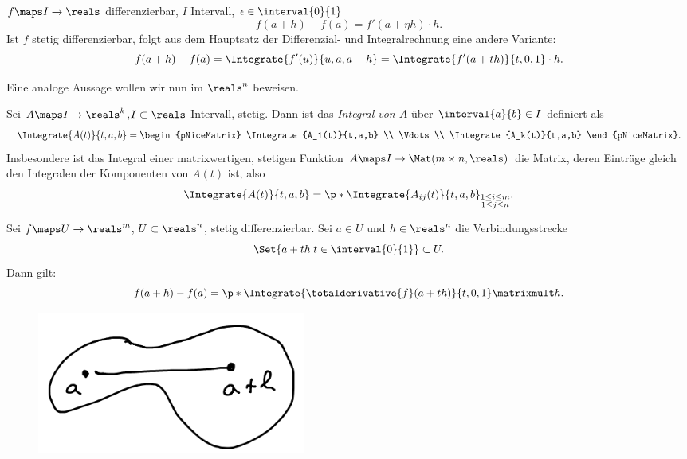 \begin{bemerkung*}
    \( f\maps I\to \reals \) differenzierbar, \( I \) Intervall, \texists \( \epsilon\in \interval{0}{1} \) \sd
    \begin{equation*}
        f(a+h)-f(a)=f'(a+\eta h)\cdot h.
    \end{equation*}
    Ist \( f \) stetig differenzierbar, folgt aus dem Hauptsatz der Differenzial- und Integralrechnung eine andere Variante:
    \begin{equation*}
        f(a+h)-f(a)=\Integrate{f'(u)}{u,a,a+h}=\Integrate{f'(a+th)}{t,0,1}\cdot h.
    \end{equation*}
\end{bemerkung*}
Eine analoge Aussage wollen wir nun im \( \reals^n \) beweisen.
\begin{definition*}
    Sei \( A\maps I\to \reals^k \),\( I\subset \reals \) Intervall, stetig. Dann ist das \emph{Integral von \( A \)} über \( \interval{a}{b}\in I \) definiert als
    \begin{equation*}
        \Integrate{A(t)}{t,a,b}=\begin{pNiceMatrix} \Integrate{A_1(t)}{t,a,b} \\ \Vdots \\ \Integrate{A_k(t)}{t,a,b} \end{pNiceMatrix}.
    \end{equation*}
    Insbesondere ist das Integral einer matrixwertigen, stetigen Funktion \( A\maps I\to \Mat(m\times n,\reals) \) die Matrix, deren Einträge gleich den Integralen der Komponenten von \( A(t) \) ist, also
    \begin{equation*}
        \Integrate{A(t)}{t,a,b}=\p*{ \Integrate{A_{ij}(t)}{t,a,b} }_{\substack{1\leq i\leq m\\1\leq j\leq n}}.
    \end{equation*}
\end{definition*}
\begin{satz}\label{verbindungsstrecke_integral_mws}
    Sei \( f\maps U\to \reals^m \), \( U\subset \reals^n \), stetig differenzierbar. Sei \( a\in U \) und \( h\in \reals^n \) \sd  die Verbindungsstrecke
    \begin{equation*}
        \Set{a+th|t\in \interval{0}{1}}\subset U.
    \end{equation*}
    Dann gilt:
    \begin{equation*}
        f(a+h)-f(a)=\p*{ \Integrate{\totalderivative{f}(a+th)}{t,0,1} }\matrixmult h.
    \end{equation*}
    \begin{figure}[H]
        \centering
        \includegraphics[width=0.5\linewidth]{figures/mws_integral_verbindungsstrecke}
        \label{fig:mws_integral_verbindungsstrecke}
    \end{figure}
\end{satz}
